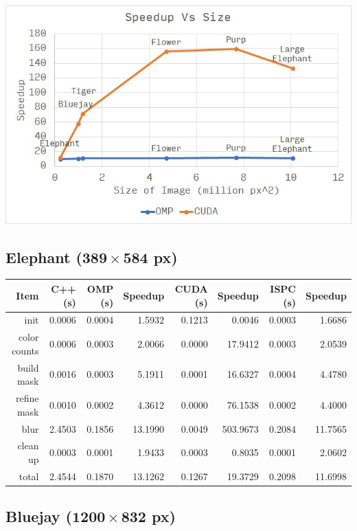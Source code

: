 \documentclass[12pt]{article}
\begin{document}
\begin{center}
\includegraphics[scale=1]{speedup.jpg}
\end{center}

\subsection{Elephant ($\mathbf{389 \times 584}$ px)}

\begin{tabular}{r|r|r|r|r|r|r|r}
    Item & C++ (s) & OMP (s) & Speedup & CUDA (s) & Speedup & ISPC (s) & Speedup
\\  \hline
    init & 0.0006 & 0.0004 & 1.5932 & 0.1213 & 0.0046 & 0.0003 & 1.6686
\\  color counts & 0.0006 & 0.0003 & 2.0066 & 0.0000 & 17.9412 & 0.0003 & 2.0539
\\  build mask & 0.0016 & 0.0003 & 5.1911 & 0.0001 & 16.6327 & 0.0004 & 4.4780
\\  refine mask & 0.0010 & 0.0002 & 4.3612 & 0.0000 & 76.1538 & 0.0002 & 4.4000
\\  blur & 2.4503 & 0.1856 & 13.1990 & 0.0049 & 503.9673 & 0.2084 & 11.7565
\\  clean up & 0.0003 & 0.0001 & 1.9433 & 0.0003 & 0.8035 & 0.0001 & 2.0602
\\  \hline
    total & 2.4544 & 0.1870 & 13.1262 & 0.1267 & 19.3729 & 0.2098 & 11.6998
\end{tabular}

\subsection{Bluejay ($\mathbf{1200 \times 832}$ px)}
\end{document}
